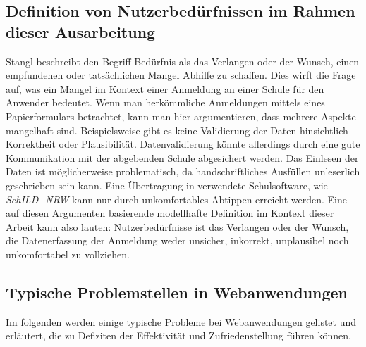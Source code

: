 \subsection{Definition von Nutzerbedürfnissen im Rahmen dieser Ausarbeitung }
\cite{stangl} 
Stangl beschreibt den Begriff Bedürfnis als \glqq das Verlangen oder der Wunsch, einen empfundenen oder tatsächlichen Mangel Abhilfe zu schaffen.\glqq \cite{stangl} Dies wirft die Frage auf, was ein Mangel im Kontext einer Anmeldung an einer Schule für den Anwender bedeutet. Wenn man herkömmliche Anmeldungen mittels eines Papierformulars betrachtet, kann man hier argumentieren, dass mehrere Aspekte mangelhaft sind. Beispielsweise gibt es keine Validierung der Daten hinsichtlich Korrektheit oder Plausibilität.  Datenvalidierung könnte allerdings durch eine gute Kommunikation mit der abgebenden Schule abgesichert werden. Das Einlesen der Daten ist möglicherweise problematisch, da handschriftliches Ausfüllen unleserlich geschrieben sein kann. Eine Übertragung in verwendete Schulsoftware, wie \textit{ \textit{SchILD} -NRW} kann nur durch unkomfortables Abtippen erreicht werden.
Eine auf diesen Argumenten basierende modellhafte Definition im Kontext dieser Arbeit kann also lauten: \glqq Nutzerbedürfnisse ist das Verlangen oder der Wunsch, die Datenerfassung der Anmeldung weder unsicher, inkorrekt, unplausibel noch unkomfortabel zu vollziehen\grqq{}.

\subsection{Typische Problemstellen in Webanwendungen}
Im folgenden werden einige typische Probleme bei Webanwendungen gelistet und erläutert, die zu Defiziten der Effektivität und Zufriedenstellung führen können.

